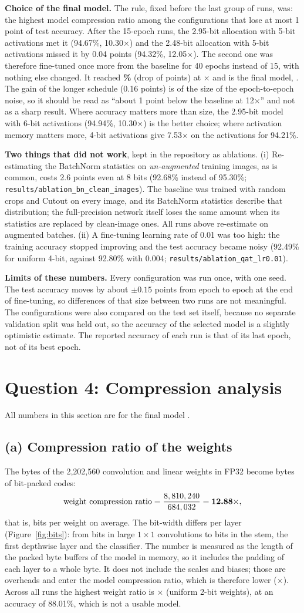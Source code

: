 \documentclass[11pt,a4paper]{article}
\newcommand{\FinalChoice}{\textbf{Choice of the final model.} The rule, fixed before the last group of runs, was: the highest model compression ratio among the configurations that lose at most 1 point of test accuracy. After the 15-epoch runs, the 2.95-bit allocation with 5-bit activations met it (94.67\%, 10.30$\times$) and the 2.48-bit allocation with 5-bit activations missed it by 0.04 points (94.32\%, 12.05$\times$). The second one was therefore fine-tuned once more from the baseline for 40 epochs instead of 15, with nothing else changed. It reached \textbf{\BestAcc\%} (drop of \BestDrop{} points) at \textbf{\BestRatio$\times$} and is the final model, \texttt{\BestName}. The gain of the longer schedule (0.16 points) is of the size of the epoch-to-epoch noise, so it should be read as ``about 1 point below the baseline at 12$\times$'' and not as a sharp result. Where accuracy matters more than size, the 2.95-bit model with 6-bit activations (94.94\%, 10.30$\times$) is the better choice; where activation memory matters more, 4-bit activations give 7.53$\times$ on the activations for 94.21\%.}
\begin{document}
\FinalChoice

\textbf{Two things that did not work}, kept in the repository as ablations. (i) Re-estimating the BatchNorm statistics on \emph{un-augmented} training images, as is common, costs 2.6 points even at 8 bits (92.68\% instead of 95.30\%; \texttt{results/ablation\_bn\_clean\_images}). The baseline was trained with random crops and Cutout on every image, and its BatchNorm statistics describe that distribution; the full-precision network itself loses the same amount when its statistics are replaced by clean-image ones. All runs above re-estimate on augmented batches. (ii) A fine-tuning learning rate of 0.01 was too high: the training accuracy stopped improving and the test accuracy became noisy (92.49\% for uniform 4-bit, against 92.80\% with 0.004; \texttt{results/ablation\_qat\_lr0.01}).

\textbf{Limits of these numbers.} Every configuration was run once, with one seed. The test accuracy moves by about $\pm0.15$ points from epoch to epoch at the end of fine-tuning, so differences of that size between two runs are not meaningful. The configurations were also compared on the test set itself, because no separate validation split was held out, so the accuracy of the selected model is a slightly optimistic estimate. The reported accuracy of each run is that of its last epoch, not of its best epoch.

\section*{Question 4: Compression analysis}

All numbers in this section are for the final model \texttt{\BestName}.

\subsection*{(a) Compression ratio of the weights}

The \FPWeightBytes{} bytes of the 2{,}202{,}560 convolution and linear weights in FP32 become \BestWeightBytes{} bytes of bit-packed codes:
\[
\text{weight compression ratio} = \frac{8,810,240}{684,032} = \textbf{12.88}\times,
\]
that is, \BestAvgWBits{} bits per weight on average.
The bit-width differs per layer (Figure~\ref{fig:bits}): from \BestMinWBits{} bits in \BestTwoBitLayers{} large $1\times1$ convolutions to \BestMaxWBits{} bits in the stem, the first depthwise layer and the classifier. The number is measured as the length of the packed byte buffers of the model in memory, so it includes the padding of each layer to a whole byte. It does not include the scales and biases; those are overheads and enter the model compression ratio, which is therefore lower (\BestRatio$\times$). Across all runs the highest weight ratio is \MaxWeightRatio$\times$ (uniform 2-bit weights), at an accuracy of 88.01\%, which is not a usable model.
\end{document}
